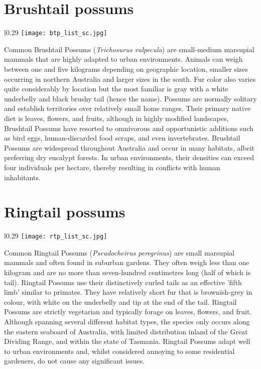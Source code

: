 \section{Brushtail possums}\label{btp}
\vspace{-0.3cm}
\setlength\intextsep{0pt}
\begin{wrapfigure}{l}{0.29\textwidth}
\centering
\texttt{[image: btp\_list\_sc.jpg]}
\end{wrapfigure}
Common Brushtail Possums (\textit{Trichosurus vulpecula}) are small-medium marsupial mammals that are highly adapted to urban environments. Animals can weigh between one and five kilograms depending on geographic location, smaller sizes occurring in northern Australia and larger sizes in the south. Fur color also varies quite considerably by location but the most familiar is gray with a white underbelly and black brushy tail (hence the name). Possums are normally solitary and establish territories over relatively small home ranges. Their primary native diet is leaves, flowers, and fruits, although in highly modified landscapes, Brushtail Possums have resorted to omnivorous and opportunistic additions such as bird eggs, human-discarded food scraps, and even invertebrates. Brushtail Possums are widespread throughout Australia and occur in many habitats, albeit preferring dry eucalypt forests. In urban environments, their densities can exceed four individuals per hectare, thereby resulting in conflicts with human inhabitants.

\section{Ringtail possums}\label{rtp}
\vspace{-0.3cm}
\setlength\intextsep{0pt}
\begin{wrapfigure}{l}{0.29\textwidth}
\centering
\texttt{[image: rtp\_list\_sc.jpg]}
\end{wrapfigure}
Common Ringtail Possums (\textit{Pseudocheirus peregrinus}) are small marsupial mammals and often found in suburban gardens. They often weigh less than one kilogram and are no more than seven-hundred centimetres long (half of which is tail). Ringtail Possums use their distinctively curled tails as an effective 'fifth limb' similar to primates. They have relatively short fur that is brownish-grey in colour, with white on the underbelly and tip at the end of the tail. Ringtail Possums are strictly vegetarian and typically forage on leaves, flowers, and fruit. Although spanning several different habitat types, the species only occurs along the eastern seaboard of Australia, with limited distribution inland of the Great Dividing Range, and within the state of Tasmania. Ringtail Possums adapt well to urban environments and, whilst considered annoying to some residential gardeners, do not cause any significant issues.